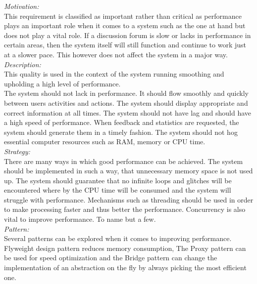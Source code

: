 \documentclass[a4paper,12pt]{report}
\begin{document}
		\emph{Motivation: }\\ This requirement is classified as important rather than critical as performance plays an important role when it comes to a system such as the one at hand but does not play a vital role. If a discussion forum is slow or lacks in performance in certain areas, then the system itself will still function and continue to work just at a slower pace. This however does not affect the system in a major way.	\\
		
		\emph{Description: }\\This quality is used in the context of the system running smoothing and upholding a high level of performance. \\
		The system should not lack in performance. It should flow smoothly and quickly between users activities and actions. The system should display appropriate and correct information at all times. The system should not have lag and should have a high speed of performance. When feedback and statistics are requested, the system should generate them in a timely fashion. The system should not hog essential computer resources such as RAM, memory or CPU time.\\
		
		\emph{Strategy: }\\ There are many ways in which good performance can be achieved. The system should be implemented in such a way, that unnecessary memory space is not used up. The system should guarantee that no infinite loops and glitches will be encountered where by the CPU time will be consumed and the system will struggle with performance. Mechanisms such as threading should be used in order to make processing faster and thus better the performance. Concurrency is also vital to improve performance. To name but a few. \\
		
	\emph{Pattern: }\\ Several patterns can be explored when it comes to improving performance. Flyweight design pattern reduces memory consumption, The Proxy pattern can be used for speed optimization and the Bridge pattern can change the implementation of an abstraction on the fly by always picking the most efficient one.\\
			
\end{document}
